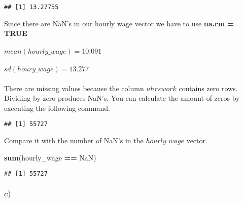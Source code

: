 \documentclass[
]{article}
\newenvironment{Shaded}{\begin{snugshade}}{\end{snugshade}}
\newcommand{\DecValTok}[1]{\textcolor[rgb]{0.00,0.00,0.81}{#1}}
\newcommand{\KeywordTok}[1]{\textcolor[rgb]{0.13,0.29,0.53}{\textbf{#1}}}
\newcommand{\NormalTok}[1]{#1}
\newcommand{\OperatorTok}[1]{\textcolor[rgb]{0.81,0.36,0.00}{\textbf{#1}}}
\newcommand{\StringTok}[1]{\textcolor[rgb]{0.31,0.60,0.02}{#1}}
\begin{document}
\begin{verbatim}
## [1] 13.27755
\end{verbatim}

Since there are NaN's in our hourly wage vector we have to use
\textbf{na.rm = TRUE}\\
~\\
\(mean(hourly\_wage) = 10.091\)\\
~\\
\(sd(houry\_wage) = 13.277\)\\
~\\
There are missing values because the column \(uhrswork\) contains zero
rows.\\
Dividing by zero produces NaN's. You can calculate the amount of zeros
by executing the following command.

\begin{Shaded}
\end{Shaded}

\begin{verbatim}
## [1] 55727
\end{verbatim}

Compare it with the number of NaN's in the \(hourly\_wage\) vector.

\begin{Shaded}
\begin{Highlighting}[]
\KeywordTok{sum}\NormalTok{(hourly\_wage }\OperatorTok{==}\StringTok{ \textquotesingle{}NaN\textquotesingle{}}\NormalTok{)}
\end{Highlighting}
\end{Shaded}

\begin{verbatim}
## [1] 55727
\end{verbatim}

\hfill\break
\hfill\break
\hfill\break

\hypertarget{c}{%
\subsubsection{\texorpdfstring{\(c)\)}{c)}}\label{c}}

\begin{Shaded}
\end{Shaded}
\end{document}
